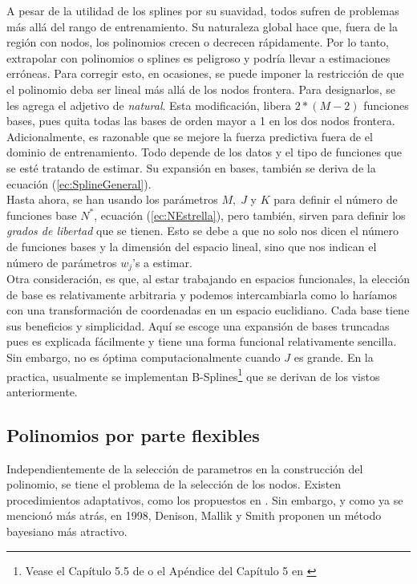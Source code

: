 \documentclass[../Main/Main.tex]{subfiles}
\begin{document}
A pesar de la utilidad de los splines por su suavidad, todos sufren de problemas más allá del rango de entrenamiento. Su naturaleza global hace que, fuera de la región con nodos, los polinomios crecen o decrecen rápidamente. Por lo tanto, extrapolar con polinomios o splines es peligroso y podría llevar a estimaciones erróneas. Para corregir esto, en ocasiones, se puede imponer la restricción de que el polinomio deba ser lineal más allá de los nodos frontera. Para designarlos, se les agrega el adjetivo de \textit{natural}. Esta modificación, libera $2*(M-2)$ funciones bases, pues quita todas las bases de orden mayor a 1 en los dos nodos frontera. Adicionalmente, es razonable que se mejore la fuerza predictiva fuera de el dominio de entrenamiento. Todo depende de los datos y el tipo de funciones que se esté tratando de estimar. Su expansión en bases, también se deriva de la ecuación (\ref{ec:SplineGeneral}).\\

Hasta ahora, se han usando los parámetros $M,\;J$ y $K$ para definir el número de funciones base $N^*$, ecuación (\ref{ec:NEstrella}), pero también, sirven para definir los \textit{grados de libertad} que se tienen. Esto se debe a que no solo nos dicen el número de funciones bases y la dimensión del espacio lineal, sino que nos indican el número de parámetros $w_j$'s a estimar. \\

Otra consideración, es que, al estar trabajando en espacios funcionales, la elección de base es relativamente arbitraria y podemos intercambiarla como lo haríamos con una transformación de coordenadas en un espacio euclidiano. Cada base tiene sus beneficios y simplicidad. Aquí se escoge una expansión de bases truncadas pues es explicada fácilmente y tiene una forma funcional relativamente sencilla. Sin embargo, no es óptima computacionalmente cuando $J$ es grande. En la practica, usualmente se implementan B-Splines\footnote{Vease el Capítulo 5.5 de \autocite{wasserman2007all} o el Apéndice del Capítulo 5 en \autocite{hastie2008elements}} que se derivan de los vistos anteriormente.  

\subsection{Polinomios por parte flexibles}

Independientemente de la selección de parametros en la construcción del polinomio, se tiene el problema de la selección de los nodos. Existen procedimientos adaptativos, como los propuestos en \autocite{friedman1991multivariate}. Sin embargo, y como ya se mencionó más atrás, en 1998, Denison, Mallik y Smith proponen un método bayesiano más atractivo.\\
\end{document}
